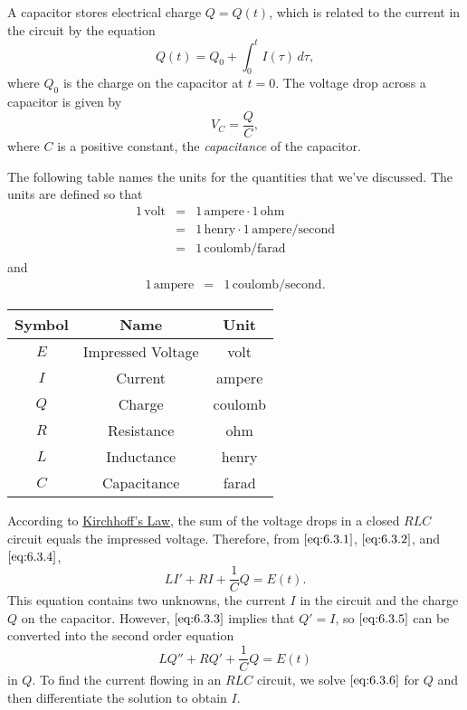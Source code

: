 \documentclass{ximera}
\begin{document}
A capacitor stores electrical charge $Q=Q(t)$, which is related to
the current in the circuit by the equation
\begin{equation} \label{eq:6.3.3}
Q(t)=Q_0+\int_0^tI(\tau)\,d\tau,
\end{equation}
where $Q_0$ is the charge on the capacitor at $t=0$. The voltage drop
across a capacitor is given by
\begin{equation} \label{eq:6.3.4}
V_C=\frac{Q}{C},
\end{equation}
where $C$ is a positive constant, the \textit{capacitance} of the
capacitor.

The following table names the units for the quantities that we've
discussed. The units are defined so that
\begin{eqnarray*}
1\,\mbox{volt}&=&1\,\mbox{ampere}\cdot1\,\mbox{ohm}\\
&=&1\,\mbox{henry}\cdot1\,\mbox{ampere}/\mbox{second}\\
&=&1\,\mbox{coulomb}/\mbox{farad}
\end{eqnarray*}
and
\begin{eqnarray*}
1\,\mbox{ampere}&=&1\,\mbox{coulomb}/\mbox{second}.
\end{eqnarray*}

\begin{center}
\begin{tabular}{|c|c|c|}
\hline
 {\bf Symbol}&{\bf Name}& {\bf Unit}\\\hline
$E$  &  Impressed Voltage & volt  \\\hline
$I$ & Current & ampere \\\hline
$Q$ & Charge & coulomb\\\hline
$R$ & Resistance& ohm\\\hline
$L$ & Inductance& henry\\\hline
$C$ & Capacitance&farad\\\hline
\end{tabular}
\end{center}

According to
\href{https://en.wikipedia.org/wiki/Kirchhoff%27s_circuit_laws}
{Kirchhoff's Law}, the sum of
the voltage drops in a closed $RLC$ circuit equals the impressed voltage. Therefore, from $\eqref{eq:6.3.1}$, $\eqref{eq:6.3.2}$, and $\eqref{eq:6.3.4}$,
\begin{equation} \label{eq:6.3.5}
 LI'+RI+\frac{1}{C}Q=E(t).
\end{equation}
This equation contains two unknowns, the current $I$ in the
circuit and the charge $Q$ on the capacitor. However, $\eqref{eq:6.3.3}$
implies that $Q'=I$, so $\eqref{eq:6.3.5}$ can be converted into the second
order equation
\begin{equation} \label{eq:6.3.6}
 LQ''+RQ'+\frac{1}{C}Q=E(t)
\end{equation}
in $Q$. To find the current flowing in an $RLC$ circuit, we solve $\eqref{eq:6.3.6}$ for $Q$ and then differentiate the solution to obtain
$I$.
\end{document}
